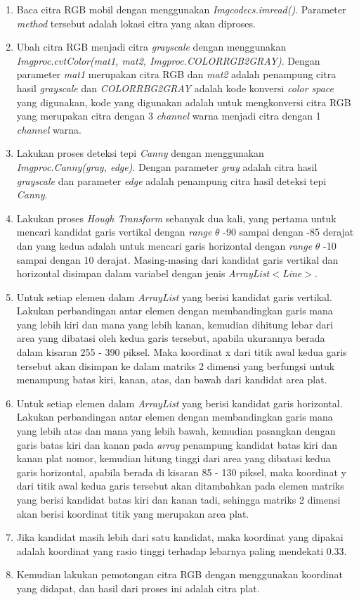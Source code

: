 \begin{enumerate}
	\item Baca citra RGB mobil dengan menggunakan \textit{Imgcodecs.imread()}. Parameter \textit{method} tersebut adalah lokasi citra yang akan diproses.
	\item Ubah citra RGB menjadi citra \textit{grayscale} dengan menggunakan \textit{Imgproc.cvtColor(mat1, mat2, Imgproc.COLORRGB2GRAY)}. Dengan parameter \textit{mat1} merupakan citra RGB dan \textit{mat2} adalah penampung citra hasil \textit{grayscale} dan \textit{COLORRBG2GRAY} adalah kode konversi \textit{color space} yang digunakan, kode yang digunakan adalah untuk mengkonversi citra RGB yang merupakan citra dengan 3 \textit{channel} warna menjadi citra dengan 1 \textit{channel} warna.
	\item Lakukan proses deteksi tepi \textit{Canny} dengan menggunakan \textit{Imgproc.Canny(gray, edge)}. Dengan parameter \textit{gray} adalah citra hasil \textit{grayscale} dan parameter \textit{edge} adalah penampung citra hasil deteksi tepi \textit{Canny}.
	\item Lakukan proses \textit{Hough Transform} sebanyak dua kali, yang pertama untuk mencari kandidat garis vertikal dengan \textit{range} $\theta$ -90 sampai dengan -85 derajat dan yang kedua adalah untuk mencari garis horizontal dengan \textit{range} $\theta$ -10 sampai dengan 10 derajat. Masing-masing dari kandidat garis vertikal dan horizontal disimpan dalam variabel dengan jenis \textit{ArrayList$<$Line$>$}.
	\item Untuk setiap elemen dalam \textit{ArrayList} yang berisi kandidat garis vertikal. Lakukan perbandingan antar elemen dengan membandingkan garis mana yang lebih kiri dan mana yang lebih kanan, kemudian dihitung lebar dari area yang dibatasi oleh kedua garis tersebut, apabila ukurannya berada dalam kisaran 255 - 390 piksel. Maka koordinat x dari titik awal kedua garis tersebut akan disimpan ke dalam matriks 2 dimensi yang berfungsi untuk menampung batas kiri, kanan, atas, dan bawah dari kandidat area plat.
	\item Untuk setiap elemen dalam \textit{ArrayList} yang berisi kandidat garis horizontal. Lakukan perbandingan antar elemen dengan membandingkan garis mana yang lebih atas dan mana yang lebih bawah, kemudian pasangkan dengan garis batas kiri dan kanan pada \textit{array} penampung kandidat batas kiri dan kanan plat nomor, kemudian hitung tinggi dari area yang dibatasi kedua garis horizontal, apabila berada di kisaran 85 - 130 piksel, maka koordinat y dari titik awal kedua garis tersebut akan ditambahkan pada elemen matriks yang berisi kandidat batas kiri dan kanan tadi, sehingga matriks 2 dimensi akan berisi koordinat titik yang merupakan area plat.
	\item Jika kandidat masih lebih dari satu kandidat, maka koordinat yang dipakai adalah koordinat yang rasio tinggi terhadap lebarnya paling mendekati 0.33.
	\item Kemudian lakukan pemotongan citra RGB dengan menggunakan koordinat yang didapat, dan hasil dari proses ini adalah citra plat.\\
\end{enumerate}
